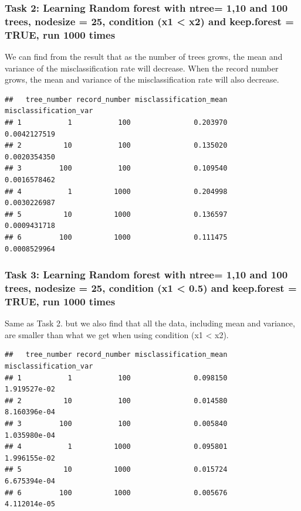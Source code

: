 \documentclass[
]{article}
\begin{document}
\hypertarget{task-2-learning-random-forest-with-ntree-110-and-100-trees-nodesize-25-condition-x1-x2-and-keep.forest-true-run-1000-times}{%
\subsubsection{Task 2: Learning Random forest with ntree= 1,10 and 100
trees, nodesize = 25, condition (x1 \textless{} x2) and keep.forest =
TRUE, run 1000
times}\label{task-2-learning-random-forest-with-ntree-110-and-100-trees-nodesize-25-condition-x1-x2-and-keep.forest-true-run-1000-times}}

We can find from the result that as the number of trees grows, the mean
and variance of the misclassification rate will decrease. When the
record number grows, the mean and variance of the misclassification rate
will also decrease.

\begin{verbatim}
##   tree_number record_number misclassification_mean misclassification_var
## 1           1           100               0.203970          0.0042127519
## 2          10           100               0.135020          0.0020354350
## 3         100           100               0.109540          0.0016578462
## 4           1          1000               0.204998          0.0030226987
## 5          10          1000               0.136597          0.0009431718
## 6         100          1000               0.111475          0.0008529964
\end{verbatim}

\hypertarget{task-3-learning-random-forest-with-ntree-110-and-100-trees-nodesize-25-condition-x1-0.5-and-keep.forest-true-run-1000-times}{%
\subsubsection{Task 3: Learning Random forest with ntree= 1,10 and 100
trees, nodesize = 25, condition (x1 \textless{} 0.5) and keep.forest =
TRUE, run 1000
times}\label{task-3-learning-random-forest-with-ntree-110-and-100-trees-nodesize-25-condition-x1-0.5-and-keep.forest-true-run-1000-times}}

Same as Task 2. but we also find that all the data, including mean and
variance, are smaller than what we get when using condition (x1
\textless{} x2).

\begin{verbatim}
##   tree_number record_number misclassification_mean misclassification_var
## 1           1           100               0.098150          1.919527e-02
## 2          10           100               0.014580          8.160396e-04
## 3         100           100               0.005840          1.035980e-04
## 4           1          1000               0.095801          1.996155e-02
## 5          10          1000               0.015724          6.675394e-04
## 6         100          1000               0.005676          4.112014e-05
\end{verbatim}
\end{document}
